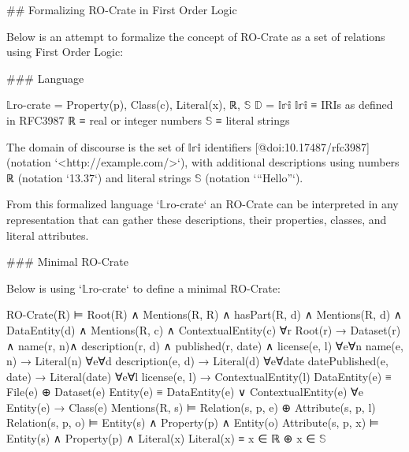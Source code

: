 

\begin{markdown}
## Formalizing RO-Crate in First Order Logic

Below is an attempt to formalize the concept of RO-Crate as a set of relations using First Order Logic:

### Language

\end{markdown}

    $\mathbb{L}$ro-crate = { Property(p), Class(c), Literal(x), ℝ, $\mathbb{S}$ }
    $\mathbb{D}$ =  $\mathbb{Iri}$
    $\mathbb{Iri}$ ≡  { IRIs as defined in RFC3987 }
    ℝ ≡  { real or integer numbers }
    $\mathbb{S}$ ≡  { literal strings }

\begin{markdown}
The domain of discourse is the set of $\mathbb{Iri}$ identifiers [@doi:10.17487/rfc3987] (notation `<http://example.com/>`), with additional descriptions using numbers ℝ (notation `13.37`) and literal strings $\mathbb{S}$ (notation `“Hello”`). 

From this formalized language `$\mathbb{L}$ro-crate` an RO-Crate can be interpreted in any representation that can gather these descriptions, their properties, classes, and literal attributes.  
\end{markdown}

\begin{markdown}
### Minimal RO-Crate

Below is using `$\mathbb{L}$ro-crate` to define a minimal RO-Crate:
\end{markdown}

    RO-Crate(R) ⊨  Root(R) ∧ Mentions(R, R) ∧
        hasPart(R, d) ∧ Mentions(R, d) ∧ DataEntity(d) ∧
        Mentions(R, c) ∧ ContextualEntity(c)
    ∀r Root(r) →  Dataset(r) ∧ name(r, n)∧ description(r, d)
                            ∧ published(r, date) ∧ license(e, l)
    ∀e∀n name(e, n) →  Literal(n)
    ∀e∀d description(e, d) →  Literal(d)
    ∀e∀date datePublished(e, date) →  Literal(date)
    ∀e∀l license(e, l) →  ContextualEntity(l)
    DataEntity(e) ≡  File(e) ⊕ Dataset(e)
    Entity(e) ≡  DataEntity(e) ∨ ContextualEntity(e)
    ∀e Entity(e) → Class(e)
    Mentions(R, s) ⊨  Relation(s, p, e)  ⊕  Attribute(s, p, l)
    Relation(s, p, o) ⊨ Entity(s) ∧ Property(p) ∧ Entity(o)
    Attribute(s, p, x) ⊨ Entity(s)  ∧ Property(p) ∧ Literal(x)
    Literal(x) ≡  x ∈ ℝ  ⊕   x ∈  $\mathbb{S}$

